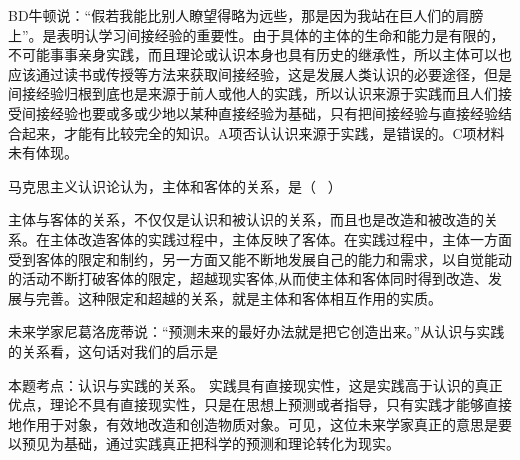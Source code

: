 \par{}
\begin{solution}BD牛顿说：``假若我能比别人瞭望得略为远些，那是因为我站在巨人们的肩膀上''。是表明认学习间接经验的重要性。由于具体的主体的生命和能力是有限的，不可能事事亲身实践，而且理论或认识本身也具有历史的继承性，所以主体可以也应该通过读书或传授等方法来获取间接经验，这是发展人类认识的必要途径，但是间接经验归根到底也是来源于前人或他人的实践，所以认识来源于实践而且人们接受间接经验也要或多或少地以某种直接经验为基础，只有把间接经验与直接经验结合起来，才能有比较完全的知识。A项否认认识来源于实践，是错误的。C项材料未有体现。
\end{solution}
\question 马克思主义认识论认为，主体和客体的关系，是（ ~）
\par{}
\begin{solution}主体与客体的关系，不仅仅是认识和被认识的关系，而且也是改造和被改造的关系。在主体改造客体的实践过程中，主体反映了客体。在实践过程中，主体一方面受到客体的限定和制约，另一方面又能不断地发展自己的能力和需求，以自觉能动的活动不断打破客体的限定，超越现实客体,从而使主体和客体同时得到改造、发展与完善。这种限定和超越的关系，就是主体和客体相互作用的实质。
\end{solution}
\question 未来学家尼葛洛庞蒂说：``预测未来的最好办法就是把它创造出来。''从认识与实践的关系看，这句话对我们的启示是
\par{}
\begin{solution}本题考点：认识与实践的关系。
实践具有直接现实性，这是实践高于认识的真正优点，理论不具有直接现实性，只是在思想上预测或者指导，只有实践才能够直接地作用于对象，有效地改造和创造物质对象。可见，这位未来学家真正的意思是要以预见为基础，通过实践真正把科学的预测和理论转化为现实。
\end{solution}

